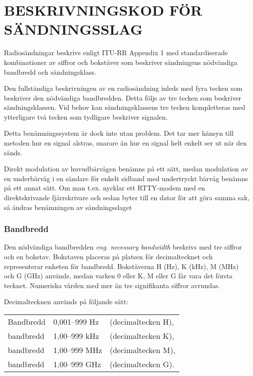 \chapter{BESKRIVNINGSKOD FÖR SÄNDNINGSSLAG}


Radiosändningar beskrivs enligt ITU-RR Appendix 1 med standardiserade
kombinationer av siffror och bokstäver som beskriver sändningens nödvändiga
bandbredd och sändningsklass.

Den fullständiga beskrivningen av en radiosändning inleds med fyra tecken
som beskriver den nödvändiga bandbredden. Detta följs av tre tecken som
beskriver sändningsklassen. Vid behov kan sändningsklassens tre tecken
kompletteras med ytterligare två tecken som tydligare beskriver signalen.

Detta benämningssystem är dock inte utan problem. Det tar mer hänsyn till
metoden hur en signal alstras, snarare än hur en signal helt enkelt ser ut när
den sänds.

Direkt modulation av huvudbärvågen benämns på ett sätt, medan modulation
av en underbärvåg i en sändare för enkelt sidband med undertryckt bärvåg
benämns på ett annat sätt. Om man t.ex. nycklar ett RTTY-modem med en
direktskrivande fjärrskrivare och sedan byter till en dator för att göra samma
sak, så ändras benämningen av sändningsslaget

\subsection{Bandbredd}

Den nödvändiga bandbredden \emph{eng. necessary bandwidth} beskrivs med
tre siffror och en bokstav. Bokstaven placeras på platsen för decimaltecknet
och representerar enheten för bandbredd. Bokstäverna H (Hz), K (kHz), M (MHz)
och G (GHz) används, medan varken 0 eller K, M eller G får vara det första
tecknet. Numeriska värden med mer än tre signifikanta siffror avrundas.

Decimaltecknen används på följande sätt:\\
\begin{tabular}{lll}
	Bandbredd & 0,001--999 Hz & (decimaltecken H),\\
	bandbredd & 1,00--999 kHz & (decimaltecken K),\\
	bandbredd & 1,00--999 MHz & (decimaltecken M),\\
	bandbredd & 1,00--999 GHz & (decimaltecken G).\\
\end{tabular}

